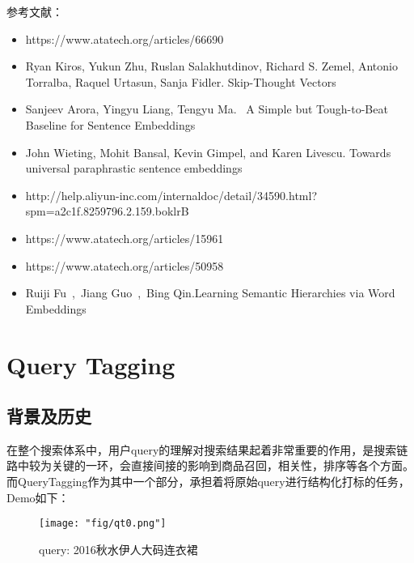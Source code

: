 参考文献：
\begin{itemize}
\item https://www.atatech.org/articles/66690
\item Ryan Kiros, Yukun Zhu, Ruslan Salakhutdinov, Richard S. Zemel, Antonio Torralba, Raquel Urtasun, Sanja Fidler. Skip-Thought Vectors
\item Sanjeev Arora, Yingyu Liang, Tengyu Ma.  A Simple but Tough-to-Beat Baseline for Sentence Embeddings
\item John Wieting, Mohit Bansal, Kevin Gimpel, and Karen Livescu. Towards universal paraphrastic sentence embeddings
\item http://help.aliyun-inc.com/internaldoc/detail/34590.html?spm=a2c1f.8259796.2.159.boklrB
\item https://www.atatech.org/articles/15961
\item https://www.atatech.org/articles/50958
\item Ruiji Fu , Jiang Guo , Bing Qin.Learning Semantic Hierarchies via Word Embeddings
\end{itemize}

\section{Query Tagging}
\subsection{背景及历史}

在整个搜索体系中，用户query的理解对搜索结果起着非常重要的作用，是搜索链路中较为关键的一环，会直接间接的影响到商品召回，相关性，排序等各个方面。而QueryTagging作为其中一个部分，承担着将原始query进行结构化打标的任务，Demo如下：

\begin{figure}[!h]
	\centering
	\texttt{[image: "fig/qt0.png"]}
	\caption{query: 2016秋水伊人大码连衣裙}
	\label{fig:qt0}
\end{figure}

